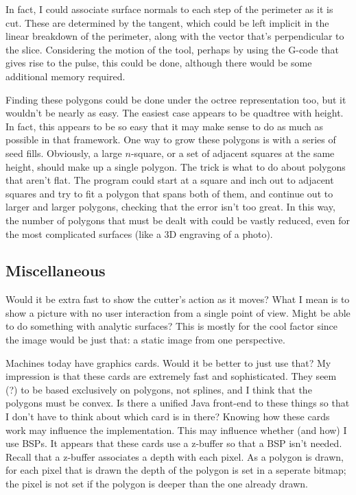 \documentclass[titlepage,oneside,10pt]{article}
\begin{document}
In fact, I could associate surface normals to each step of the
perimeter as it is cut. These are determined by the tangent, which
could be left implicit in the linear breakdown of the perimeter, along
with the vector that's perpendicular to the slice. Considering the
motion of the tool, perhaps by using the G-code that gives rise to the
pulse, this could be done, although there would be some additional
memory required.

Finding these polygons could be done under the octree representation too,
but it wouldn't be nearly as easy. The easiest case appears to be
quadtree with height. In fact, this appears to be so easy that it may
make sense to do as much as possible in that framework. One way to
grow these polygons is with a series of seed fills. Obviously, a
large $n$-square, or a set of adjacent squares at the same height,
should make up a single polygon. The trick is what to do about
polygons that aren't flat. The program could start at a square and
inch out to adjacent squares and try to fit a polygon that spans both
of them, and continue out to larger and larger polygons, checking that
the error isn't too great. In this way, the number of polygons that
must be dealt with could be vastly reduced, even for the most
complicated surfaces (like a 3D engraving of a photo).

\subsection{Miscellaneous}

Would it be extra fast to show the cutter's action as it moves? What I
mean is to show a picture with no user interaction from a single point
of view. Might be able to do something with analytic surfaces? This is
mostly for the cool factor since the image would be just that: a static
image from one perspective.

Machines today have graphics cards. Would it be better to just
use that? My impression is that these cards are extremely fast and
sophisticated. They seem (?) to be based exclusively on polygons, not
splines, and I think that the polygons must be convex. Is there a
unified Java front-end to these things so 
that I don't have to think about which card is in there? Knowing how
these cards work may influence the implementation. This may influence
whether (and how) I use BSPs. It appears that these cards use a
z-buffer so that a BSP isn't needed. Recall that a z-buffer associates
a depth with each pixel. As a polygon is drawn, for each pixel that is
drawn the depth of the polygon is set in a seperate bitmap; the pixel
is not set if the polygon is deeper than the one already drawn.
\end{document}

